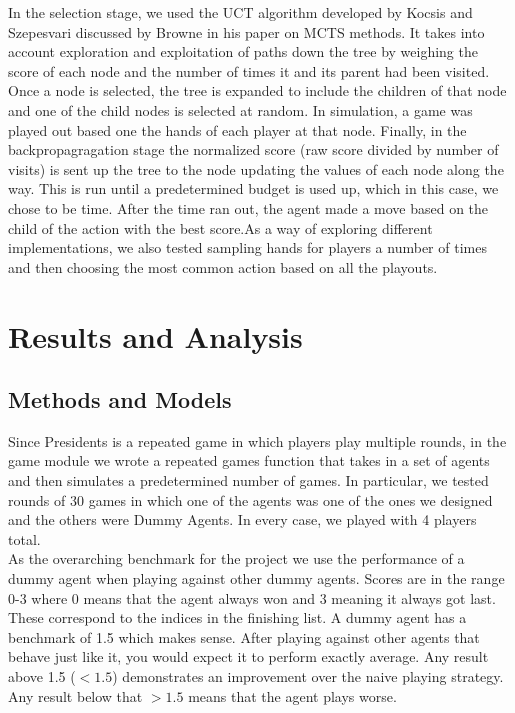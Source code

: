 \documentclass[11pt]{article}
\begin{document}
In the selection stage, we used the UCT algorithm developed by Kocsis and Szepesvari discussed by Browne in his paper on MCTS methods. It takes into account exploration and exploitation of paths down the tree by weighing the score of each node and the number of times it and its parent had been visited. Once a node is selected, the tree is expanded to include the children of that node and one of the child nodes is selected at random. In simulation, a game was played out based one the hands of each player at that node. Finally, in the backpropagragation stage the normalized score (raw score divided by number of visits) is sent up the tree to the node updating the values of each node along the way. This is run until a predetermined budget is used up, which in this case, we chose to be time. After the time ran out, the agent made a move based on the child of the action with the best score.As a way of exploring different implementations, we also tested sampling hands for players a number of times and then choosing the most common action based on all the playouts.



\section{Results and Analysis}


\subsection{Methods and Models}

Since Presidents is a repeated game in which players play multiple rounds, in the game module we wrote a repeated games function that takes in a set of agents and then simulates a predetermined number of games. In particular, we tested rounds of 30 games in which one of the agents was one of the ones we designed and the others were Dummy Agents. In every case, we played with 4 players total. \\

As the overarching benchmark for the project we use the performance of a dummy agent when playing against other dummy agents. Scores are in the range 0-3 where 0 means that the agent always won and 3 meaning it always got last. These correspond to the indices in the finishing list. A dummy agent has a benchmark of 1.5 which makes sense. After playing against other agents that behave just like it, you would expect it to perform exactly average. Any result above 1.5 ($<1.5$) demonstrates an improvement over the naive playing strategy. Any result below that $>1.5$ means that the agent plays worse.\\
\end{document}
